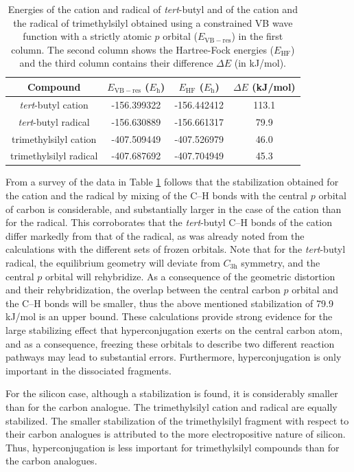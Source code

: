 \begin{table}[htp]
\center
\caption{Energies of the cation and radical of \textit{tert}-butyl and of the cation and the radical of trimethylsilyl obtained using a constrained VB wave function with a strictly atomic $p$ orbital ($E_\mathrm{VB-res}$) in the first column. The second column shows the Hartree-Fock energies ($E_\mathrm{HF}$) and the third column contains their difference $\Delta E$ (in kJ/mol).}
\label{ch3.tab.hyp}
\begin{tabular}{|c|c|c|c|}
\hline
\textbf{Compound} & $E_\mathrm{VB-res}$ ($E_{\mathrm{h}}$) &$E_\mathrm{HF}$ ($E_{\mathrm{h}}$)& $\Delta E$ (kJ/mol)  \\
\hline
\textit{tert}-butyl cation & -156.399322 &-156.442412&113.1  \\
\textit{tert}-butyl radical & -156.630889 &-156.661317&79.9 \\
trimethylsilyl cation & -407.509449&-407.526979&46.0 \\
trimethylsilyl radical &-407.687692&-407.704949&45.3 \\
\hline
\end{tabular}
\end{table}

From a survey of the data in Table \ref{ch3.tab.hyp} follows that the stabilization obtained for the cation and the radical by mixing of the C--H bonds with the central $p$ orbital of carbon is considerable, and substantially larger in the case of the cation than for the radical.  This  corroborates that the \textit{tert}-butyl C--H bonds of the cation differ markedly from that of the radical, as was already noted from the calculations with the different sets of frozen orbitals.  Note that for the \textit{tert}-butyl radical, the equilibrium geometry will deviate from $C_\mathrm{3h}$ symmetry, and the central $p$ orbital will rehybridize.  As a consequence of the geometric distortion and their rehybridization, the overlap between the central carbon $p$ orbital and the C--H bonds will be smaller, thus the above mentioned stabilization of 79.9 kJ/mol is an upper bound.  These calculations provide strong evidence for the large stabilizing effect that hyperconjugation exerts on the central carbon atom, and as a consequence, freezing these orbitals to describe two different reaction pathways may lead to substantial errors.  Furthermore, hyperconjugation is only important in the dissociated fragments.

For the silicon case, although a stabilization is found, it is considerably smaller than for the carbon analogue.  The trimethylsilyl cation and radical are equally stabilized.  The smaller stabilization of the trimethylsilyl fragment with respect to their carbon analogues is attributed to the more electropositive nature of silicon. Thus, hyperconjugation is less important for trimethylsilyl compounds than for the carbon analogues.

